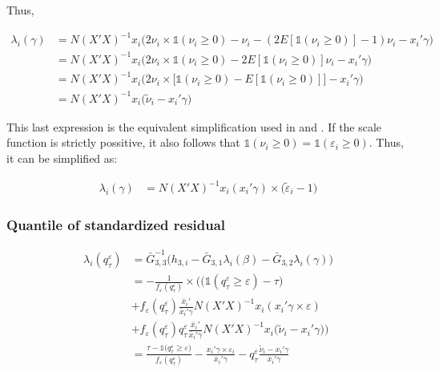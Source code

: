 \documentclass[
  authoryear,
  preprint,
  1p]{elsarticle}
\begin{document}
Thus,

\[\begin{aligned}
\lambda_i(\gamma) &= N(X'X)^{-1} x_i   \Big( 2 \nu_i \times \mathbb{1}(\nu_i \geq 0) - \nu_i  - ( 2 E[\mathbb{1}(\nu_i \geq 0)] - 1) \nu_i -x_i' \gamma \Big) \\
  &= N(X'X)^{-1} x_i   \Big( 2 \nu_i \times \mathbb{1}(\nu_i \geq 0) -  2 E[\mathbb{1}(\nu_i \geq 0)] \nu_i -x_i' \gamma \Big) \\
  &= N(X'X)^{-1} x_i   \Big( 2 \nu_i \times \big[ \mathbb{1}(\nu_i \geq 0) -  E[\mathbb{1}(\nu_i \geq 0)] \big] -x_i'\gamma \Big) \\
  &= N(X'X)^{-1} x_i   \Big( \tilde \nu_i -x_i' 
  \gamma \Big)
\end{aligned}
\]

This last expression is the equivalent simplification used in
\citet{mss2019} and \citet{im2000}. If the scale function is strictly
possitive, it also follows that
\(\mathbb{1}(\nu_i \geq 0)= \mathbb{1}(\varepsilon_i \geq 0)\). Thus, it
can be simplified as:

\[\begin{aligned}
\lambda_i(\gamma) &= N(X'X)^{-1} x_i ( x_i' \gamma ) \times (\tilde \varepsilon_i -1\big)
\end{aligned}
\]

\hypertarget{quantile-of-standardized-residual}{%
\subsubsection{Quantile of standardized
residual}\label{quantile-of-standardized-residual}}

\[\begin{aligned}
\lambda_i(q^\varepsilon_\tau)&=\bar G_{3,3}^{-1}
\Big(
 h_{3,i}-\bar G_{3,1} \lambda_i(\beta)-\bar G_{3,2} \lambda_i(\gamma)
\Big) \\
&=-\frac{1}{f_{\varepsilon}(q^\varepsilon_\tau)} \times \Bigg( \Big(\mathbb{1} ( q^\varepsilon_\tau  \geq \varepsilon  ) - \tau \Big)  \\
&+ f_{\varepsilon} (q^\varepsilon_\tau) \frac{\bar x_i'}{\bar x_i'\gamma} 
N (X'X)^{-1} x_i  ( x_i'\gamma \times \varepsilon) \\
&+ f_{\varepsilon}(q^\varepsilon_\tau) q^\varepsilon_\tau \frac{\bar x_i'}{\bar x_i'\gamma} N(X'X)^{-1} x_i   \big( \tilde \nu_i -x_i' 
  \gamma \big) 
\Bigg) \\
&=\frac{\tau-\mathbb{1}\big( q^\varepsilon_\tau  \geq \varepsilon  \big) }{f_{\varepsilon}(q^\varepsilon_\tau)}
- \frac{ x_i'\gamma \times \varepsilon_i }{\bar x_i'\gamma} 
-  q^\varepsilon_\tau \frac{ \tilde \nu_i -x_i' 
  \gamma }{\bar x_i'\gamma} 
\end{aligned}
\]


\renewcommand\refname{References}
  
\end{document}
